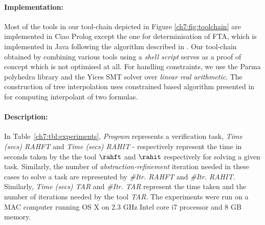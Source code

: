 \paragraph{Implementation:}
Most of the tools in our tool-chain depicted in Figure \ref{ch7:fig:toolchain} are implemented in Ciao Prolog \cite{DBLP:journals/tplp/HermenegildoBCLMMP12} except the one for  determinisation of FTA, which is implemented in Java following the algorithm described in  \cite{DBLP:journals/corr/GallagherAK15}. Our tool-chain obtained by combining  various tools using a \emph{shell script} serves as a proof of concept which is not optimised at all. For handling constraints, we  use the Parma polyhedra library \cite{DBLP:journals/scp/BagnaraHZ08} and the Yices SMT solver \cite{Dutertre:cav2014} over \emph{linear real arithmetic}. The construction of tree interpolation uses constrained based algorithm presented in \cite{DBLP:journals/jsc/RybalchenkoS10} for computing interpolant of two formulas. 

\paragraph{Description:} In Table~\ref{ch7:tbl:experiments},  {\it Program} represents a verification task, {\it Time (secs) RAHFT} and {\it Time (secs) RAHIT} - respectively represent the time in seconds taken by the the tool  $\rahft$ and  $\rahit$ respectively for solving a given task. Similarly,  the number of \emph{abstraction-refinement} iteration needed in these cases to solve a task are represented by   {\it \#Itr. RAHFT} and {\it \#Itr. RAHIT}. Similarly, {\it Time (secs) TAR} and {\it \#Itr. TAR} represent the time taken and the number of iterations  needed by the  tool \emph{TAR}. The experiments were run on a MAC computer running  OS X on  2.3 GHz Intel core i7 processor  and 8 GB memory.

